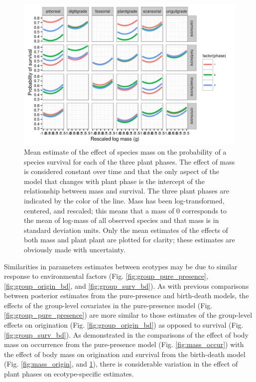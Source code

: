 \documentclass[12pt,letterpaper]{article}
\begin{document}
\begin{figure}[ht]
  \centering
  \includegraphics[width=\textwidth,height=0.4\textheight,keepaspectratio=true]{figure/mass_on_surv_bd}
  \caption[Effect of mass on probability of species survival as estimated from the birth-death model]{Mean estimate of the effect of species mass on the probability of a species survival for each of the three plant phases. The effect of mass is considered constant over time and that the only aspect of the model that changes with plant phase is the intercept of the relationship between mass and survival. The three plant phases are indicated by the color of the line. Mass has been log-transformed, centered, and rescaled; this means that a mass of 0 corresponds to the mean of log-mass of all observed species and that mass is in standard deviation units. Only the mean estimates of the effects of both mass and plant plant are plotted for clarity; these estimates are obviously made with uncertainty.}
  \label{fig:mass_survival}
\end{figure}



Similarities in parameters estimates between ecotypes may be due to similar response to environmental factors (Fig. \ref{fig:group_pure_presence}, \ref{fig:group_origin_bd}, and \ref{fig:group_surv_bd}). As with previous comparisons between posterior estimates from the pure-presence and birth-death models, the effects of the group-level covariates in the pure-presence model (Fig. \ref{fig:group_pure_presence})  are more similar to those estimates of the group-level effects on origination (Fig. \ref{fig:group_origin_bd}) as opposed to survival (Fig. \ref{fig:group_surv_bd}). As demonstrated in the comparisons of the effect of body mass on occurrence from the pure-presence model (Fig. \ref{fig:mass_occur}) with the effect of body mass on origination and survival from the birth-death model (Fig. \ref{fig:mass_origin}, and \ref{fig:mass_survival}), there is considerable variation in the effect of plant phases on ecotype-specific estimates.
\end{document}
